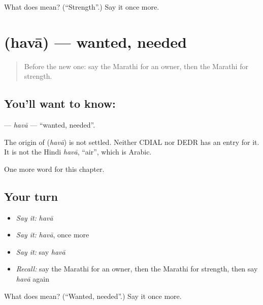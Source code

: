\begin{tcolorbox}[breakable,colback=teal!4,colframe=teal!35!black,title={Before you move on}]
What does  mean? (\textquotedblleft{}Strength\textquotedblright{}.) Say it once more.
\end{tcolorbox}
\section[\texorpdfstring{\mr{हवा} (havā)}{हवा (havā)}]{ (havā) — wanted, needed}

\label{lesson:MR-C122-hava}



\begin{quote}
Before the new one: say the Marathi for an owner, then the Marathi for strength.
\end{quote}

\subsection*{You'll want to know: }
\textbf{} — \emph{havā} — \textquotedblleft{}wanted, needed\textquotedblright{}.

\begin{cousinweb}
The origin of \textbf{} (\emph{havā}) is not settled. Neither CDIAL nor DEDR has an entry for it. It is not the Hindi \emph{havā}, \textquotedblleft{}air\textquotedblright{}, which is Arabic.
\end{cousinweb}

\begin{grammarlens}[title={What you've built}]
One more word for this chapter.
\end{grammarlens}

\subsection*{Your turn}
\begin{itemize}
\raggedright
  \item \emph{Say it:} \emph{havā}
  \item \emph{Say it:} \emph{havā}, once more
  \item \emph{Say it:} say \emph{havā}
  \item \emph{Recall:} say the Marathi for an owner, then the Marathi for strength, then say \emph{havā} again
\end{itemize}

\begin{tcolorbox}[breakable,colback=teal!4,colframe=teal!35!black,title={Before you move on}]
What does  mean? (\textquotedblleft{}Wanted, needed\textquotedblright{}.) Say it once more.
\end{tcolorbox}
